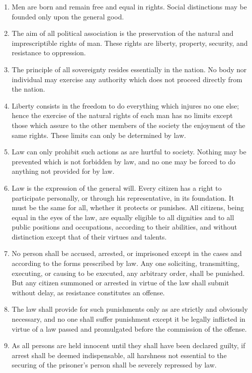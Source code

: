 \documentclass[letterpaper,12pt]{article}
\begin{document}
\begin{enumerate}
  \item Men are born and remain free and equal in rights. Social distinctions may be founded only upon the general good.
  \item The aim of all political association is the preservation of the natural and imprescriptible rights of man. These rights are liberty, property, security, and resistance to oppression.
  \item The principle of all sovereignty resides essentially in the nation. No body nor individual may exercise any authority which does not proceed directly from the nation.
  \item Liberty consists in the freedom to do everything which injures no one else; hence the exercise of the natural rights of each man has no limits except those which assure to the other members of the society the enjoyment of the same rights. These limits can only be determined by law.
  \item Law can only prohibit such actions as are hurtful to society. Nothing may be prevented which is not forbidden by law, and no one may be forced to do anything not provided for by law.
  \item Law is the expression of the general will. Every citizen has a right to participate personally, or through his representative, in its foundation. It must be the same for all, whether it protects or punishes. All citizens, being equal in the eyes of the law, are equally eligible to all dignities and to all public positions and occupations, according to their abilities, and without distinction except that of their virtues and talents.
  \item No person shall be accused, arrested, or imprisoned except in the cases and according to the forms prescribed by law. Any one soliciting, transmitting, executing, or causing to be executed, any arbitrary order, shall be punished. But any citizen summoned or arrested in virtue of the law shall submit without delay, as resistance constitutes an offense.
  \item The law shall provide for such punishments only as are strictly and obviously necessary, and no one shall suffer punishment except it be legally inflicted in virtue of a law passed and promulgated before the commission of the offense.
  \item As all persons are held innocent until they shall have been declared guilty, if arrest shall be deemed indispensable, all harshness not essential to the securing of the prisoner's person shall be severely repressed by law.

\end{enumerate}
\end{document}

